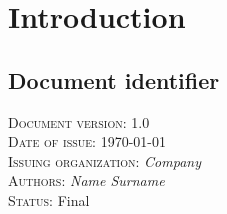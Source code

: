 \chapter{Introduction} \label{chp:introduction}

\section{Document identifier} \label{s:introduction:document-identifier}
	\begin{comment}
		$<$Uniquely identify a version of the document by including information such as the date of issue, the issuing organization, the author(s), the approval signatures (possibly electronic), and the status/version (e.g., draft, reviewed, corrected, or final). Identifying information may also include the reviewers and pertinent managers. This information is commonly put on an early page in the document, such as the cover page or the pages immediately following it. Some organizations put this information at the end of the document. This information may also be kept in a place other than in the text of the document (e.g., in the configuration management system or in the header or footer of the document).$>$
	\end{comment}
	\textsc{Document version: } 1.0 \\
	\textsc{Date of issue:} \today \\
	\textsc{Issuing organization:} \textit{Company} \\
	\textsc{Authors: } \textit{Name Surname} \\
	\textsc{Status: } Final \\

